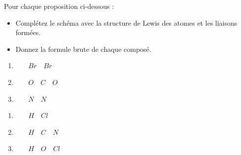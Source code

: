 \documentclass[
  11pt,
  a4paper,
  openany]{book}
\providecommand{\tightlist}{%
  \setlength{\itemsep}{0pt}\setlength{\parskip}{0pt}}
\begin{document}
\begin{Exercise}

Pour chaque proposition ci-dessous :

\begin{itemize}
\tightlist
\item
  Complétez le schéma avec la structure de Lewis des atomes et les liaisons formées.
\item
  Donnez la formule brute de chaque composé.
\end{itemize}

\begin{multicols}{3}

\begin{enumerate}
\def\labelenumi{\arabic{enumi}.}
\item
  ~~~ \(Br \quad Br\)
\item
  ~~~ \(O \quad C \quad O\)
\item
  ~~~ \(N \quad N\)
\end{enumerate}

\end{multicols}


\begin{multicols}{3}

\begin{enumerate}
\def\labelenumi{\arabic{enumi}.}
\setcounter{enumi}{3}
\item
  ~~~ \(H \quad Cl\)
\item
  ~~~ \(H \quad C \quad N\)
\item
  ~~~ \(H \quad O \quad Cl\)
\end{enumerate}

\end{multicols}


\end{Exercise}
\end{document}
